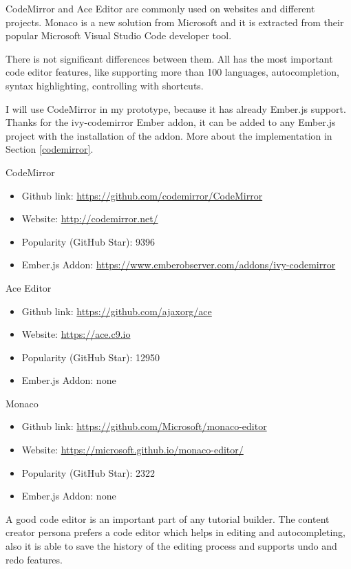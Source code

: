 \documentclass[11pt, a4paper, oneside, openright, medskipamount]{report}
\begin{document}
CodeMirror and Ace Editor are commonly used on websites and different projects. Monaco is a new solution from Microsoft and it is extracted from their popular Microsoft Visual Studio Code developer tool.

There is not significant differences between them. All has the most important code editor features, like supporting more than 100 languages, autocompletion, syntax highlighting, controlling with shortcuts.

I will use CodeMirror in my prototype, because it has already Ember.js support. Thanks for the ivy-codemirror Ember addon, it can be added to any Ember.js project with the installation of the addon. More about the implementation in Section \ref{codemirror}.

\noindent CodeMirror
\begin{itemize}[noitemsep]
\item Github link: \url{https://github.com/codemirror/CodeMirror}
\item Website: \url{http://codemirror.net/}
\item Popularity (GitHub Star): 9396
\item Ember.js Addon: \url{https://www.emberobserver.com/addons/ivy-codemirror}
\end{itemize}

\noindent Ace Editor
\begin{itemize}[noitemsep]
\item Github link: \url{https://github.com/ajaxorg/ace}
\item Website: \url{https://ace.c9.io}
\item Popularity (GitHub Star): 12950
\item Ember.js Addon: none
\end{itemize}

\noindent Monaco
\begin{itemize}[noitemsep]
\item Github link: \url{https://github.com/Microsoft/monaco-editor}
\item Website: \url{https://microsoft.github.io/monaco-editor/}
\item Popularity (GitHub Star): 2322
\item Ember.js Addon: none
\end{itemize}

A good code editor is an important part of any tutorial builder. The content creator persona prefers a code editor which helps in editing and autocompleting, also it is able to save the history of the editing process and supports undo and redo features.
\end{document}
